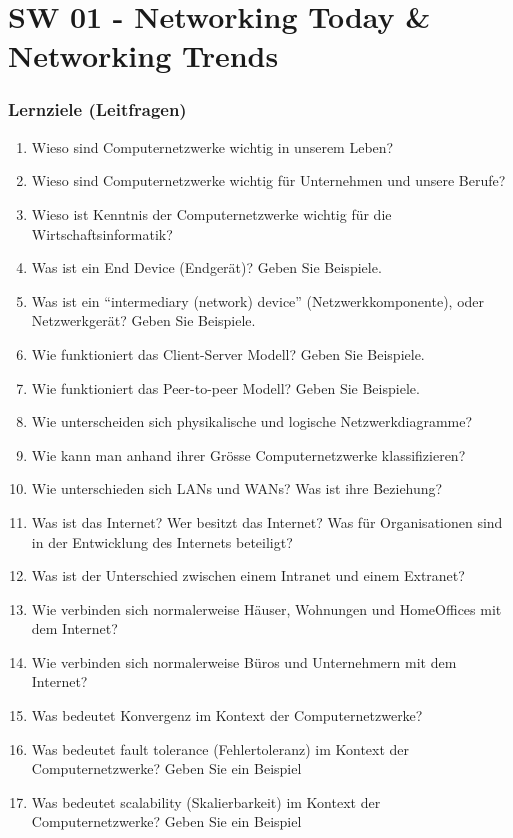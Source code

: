 \part{SW 01 - Networking Today \& Networking Trends}\label{part:sw01}
\section{Lernziele (Leitfragen)}
\begin{enumerate}
    \item Wieso sind Computernetzwerke wichtig in unserem Leben?
    \item Wieso sind Computernetzwerke wichtig für Unternehmen und unsere Berufe?
    \item Wieso ist Kenntnis der Computernetzwerke wichtig für die Wirtschaftsinformatik?
    \item Was ist ein \flqq End Device\frqq{} (Endgerät)? Geben Sie Beispiele.
    \item Was ist ein ``intermediary (network) device'' (Netzwerkkomponente), oder Netzwerkgerät? Geben Sie Beispiele.
    \item Wie funktioniert das \flqq Client-Server\frqq{} Modell? Geben Sie Beispiele.
    \item Wie funktioniert das \flqq Peer-to-peer\frqq{} Modell? Geben Sie Beispiele.
    \item Wie unterscheiden sich physikalische und logische Netzwerkdiagramme?
    \item Wie kann man anhand ihrer Grösse Computernetzwerke klassifizieren?
    \item Wie unterschieden sich LANs und WANs? Was ist ihre Beziehung?
    \item Was ist das Internet? Wer besitzt das Internet? Was für Organisationen sind in der Entwicklung des Internets beteiligt?
    \item Was ist der Unterschied zwischen einem Intranet und einem Extranet?
    \item Wie verbinden sich normalerweise Häuser, Wohnungen und HomeOffices mit dem Internet?
    \item Wie verbinden sich normalerweise Büros und Unternehmern mit dem Internet?
    \item Was bedeutet Konvergenz im Kontext der Computernetzwerke?
    \item Was bedeutet \flqq fault tolerance\frqq{}  (Fehlertoleranz) im Kontext der Computernetzwerke? Geben Sie ein Beispiel
    \item Was bedeutet \flqq scalability\frqq{}  (Skalierbarkeit) im Kontext der Computernetzwerke? Geben Sie ein Beispiel

\end{enumerate}
